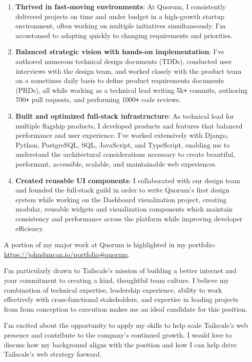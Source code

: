 \documentclass[]{article}
\def\Plus{\texttt{+}}
\begin{document}
\begin{enumerate}
  Other projects of similar scope and complexity are listed in my full CV: \url{https://johnduncan.io/cv.pdf}.
  \item \textbf{Thrived in fast-moving environments}: At Quorum, I consistently delivered projects on time and under budget in a high-growth startup environment, often working on multiple initiatives simultaneously. I'm accustomed to adapting quickly to changing requirements and priorities.
  \item \textbf{Balanced strategic vision with hands-on implementation}: I've authored numerous technical design documents (TDDs), conducted user interviews with the design team, and worked closely with the product team on a sometimes daily basis to define product requirements documents (PRDs), all while working as a technical lead writing 5k{\Plus} commits, authoring 700{\Plus} pull requests, and performing 1000{\Plus} code reviews.
  \item \textbf{Built and optimized full-stack infrastructure}: As technical lead for multiple flagship products, I developed products and features that balanced performance and user experience. I've worked extensively with Django, Python, PostgreSQL, SQL, JavaScript, and TypeScript, enabling me to understand the architectural considerations necessary to create beautiful, performant, accessible, scalable, and maintainable web experiences.
  \item \textbf{Created reusable UI components}: I collaborated with our design team and founded the full-stack guild in order to write Quorum's first design system while working on the Dashboard visualization project, creating modular, reusable widgets and visualization components which maintain consistency and performance across the platform while improving developer efficiency.
\end{enumerate}

A portion of my major work at Quorum is highlighted in my portfolio: \url{https://johnduncan.io/portfolio#quorum}.

I'm particularly drawn to Tailscale's mission of building a better internet and your commitment to creating a kind, thoughtful team culture. I believe my combination of technical expertise, leadership experience, ability to work effectively with cross-functional stakeholders, and expertise in leading projects from from conception to execution makes me an ideal candidate for this position.

I'm excited about the opportunity to apply my skills to help scale Tailscale's web presence and contribute to the company's continued growth. I would love to discuss how my background aligns with the position and how I can help drive Tailscale's web strategy forward. 
\end{document}
